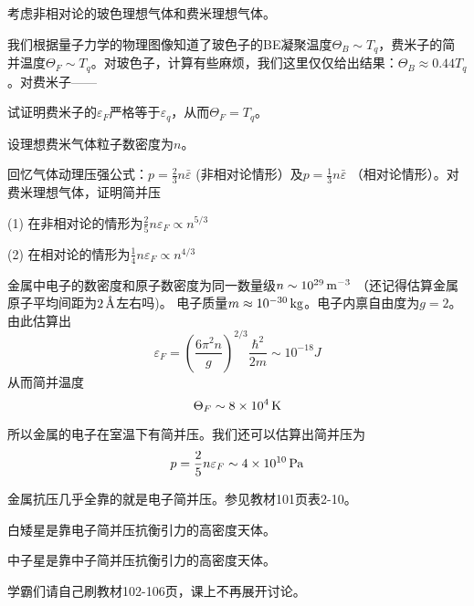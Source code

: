 \documentclass[CJK]{beamer}
\begin{document}
\begin{frame}
\bch
{\small

考虑非相对论的玻色理想气体和费米理想气体。

\skipline

我们根据量子力学的物理图像知道了玻色子的BE凝聚温度$\Theta_B \sim T_q$，费米子的简并温度$\Theta_F\sim T_q$。对玻色子，计算有些麻烦，我们这里仅仅给出结果：$\Theta_B \approx 0.44 T_q$。对费米子——


试证明费米子的$\varepsilon_F$严格等于$\varepsilon_q$，从而$\Theta_F = T_q$。

}
\ech
\end{frame}

\begin{frame}
\bch
设理想费米气体粒子数密度为$n$。

\skiplines

回忆气体动理压强公式：$p =\frac{2}{3}n\bar\varepsilon$ (非相对论情形）及$p =\frac{1}{3}n\bar\varepsilon$ （相对论情形）。对费米理想气体，证明简并压
\bitem
\item[(1)]{在非相对论的情形为$\frac{2}{5}n\varepsilon_F \propto n^{5/3}$}
\item[(2)]{在相对论的情形为$\frac{1}{4}n\varepsilon_F \propto n^{4/3}$}
\eitem
\ech
\end{frame}


\begin{frame}
\bch
金属中电子的数密度和原子数密度为同一数量级$n\sim 10^{29} \,\mathrm{m}^{-3}$ （还记得估算金属原子平均间距为$2\,\text{\AA}$左右吗)。
电子质量$m\approx 10^{-30} \,\mathrm{kg}$。电子内禀自由度为$g = 2$。由此估算出
$$\varepsilon_F = \left(\frac{6\pi^2 n}{ g}\right)^{2/3} \frac{\hbar^2}{2m} \sim 10^{-18}J $$
从而简并温度
$$\Theta_F \sim 8\times 10^4 \,\mathrm{K}$$


所以金属的电子在室温下有简并压。我们还可以估算出简并压为
$$ p = \frac{2}{5} n \varepsilon_F \sim 4\times 10^{10}\,\mathrm{Pa}$$


金属抗压几乎全靠的就是电子简并压。参见教材101页表2-10。

\ech
\end{frame}


\begin{frame}
\bch
\bitem
\item{白矮星是靠电子简并压抗衡引力的高密度天体。}
\item{中子星是靠中子简并压抗衡引力的高密度天体。}
\eitem

学霸们请自己刷教材102-106页，课上不再展开讨论。

\ech
\end{frame}
\end{document}
